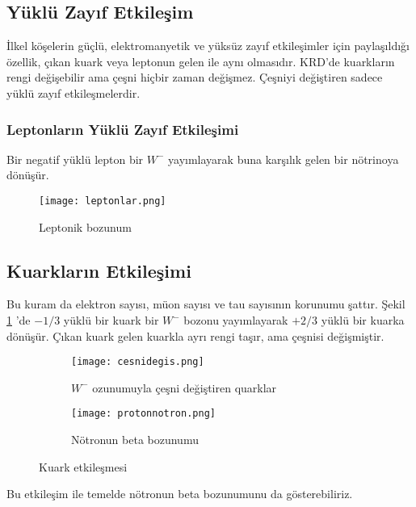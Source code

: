\subsection{Yüklü Zayıf Etkileşim}
İlkel köşelerin güçlü, elektromanyetik ve yüksüz zayıf etkileşimler için paylaşıldığı özellik, çıkan kuark veya leptonun gelen ile aynı olmasıdır. KRD'de kuarkların rengi değişebilir ama çeşni hiçbir zaman değişmez. Çeşniyi değiştiren sadece yüklü zayıf etkileşmelerdir.
\subsubsection{Leptonların Yüklü Zayıf Etkileşimi}
Bir negatif yüklü lepton bir $W^-$ yayımlayarak buna karşılık gelen bir nötrinoya dönüşür. 
\begin{figure}[!htpb]
\centering
\texttt{[image: leptonlar.png]}
\caption{Leptonik bozunum}
\end{figure}


\subsection{Kuarkların Etkileşimi}
Bu kuram da elektron sayısı, müon sayısı ve tau sayısının korunumu şattır. Şekil \ref{fig:cesnidegis} 'de $-1/3$ yüklü bir kuark bir $W^-$ bozonu yayımlayarak $+2/3$ yüklü bir kuarka dönüşür. Çıkan kuark gelen kuarkla ayrı rengi taşır, ama çeşnisi değişmiştir.

\begin{figure}[!htpb]
\centering
\begin{subfigure}{.5\textwidth}
  \centering
  \texttt{[image: cesnidegis.png]}
  \caption{$W^-$ ozunumuyla çeşni değiştiren quarklar}
  \label{fig:cesnidegis}
\end{subfigure}%
\begin{subfigure}{.5\textwidth}
  \centering
  \texttt{[image: protonnotron.png]}
  \caption{Nötronun beta bozunumu}
  \label{fig:sub2}
\end{subfigure}
\caption{Kuark etkileşmesi}
\label{fig:test}
\end{figure}

Bu etkileşim ile temelde nötronun beta bozunumunu da gösterebiliriz.

